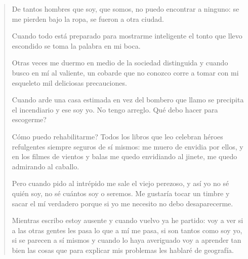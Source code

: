 \documentclass[12pt]{article}
\begin{document}
\clearpage
{}
\begin{verse}
De tantos hombres que soy, que somos,  
no puedo encontrar a ninguno:  
se me pierden bajo la ropa,  
se fueron a otra ciudad.  

Cuando todo está preparado  
para mostrarme inteligente  
el tonto que llevo escondido  
se toma la palabra en mi boca.  

Otras veces me duermo en medio  
de la sociedad distinguida  
y cuando busco en mí al valiente,  
un cobarde que no conozco  
corre a tomar con mi esqueleto  
mil deliciosas precauciones.  

Cuando arde una casa estimada  
en vez del bombero que llamo  
se precipita el incendiario  
y ese soy yo. No tengo arreglo.  
Qué debo hacer para escogerme?  

Cómo puedo rehabilitarme?  
Todos los libros que leo  
celebran héroes refulgentes  
siempre seguros de sí mismos:  
me muero de envidia por ellos,  
y en los filmes de vientos y balas  
me quedo envidiando al jinete,  
me quedo admirando al caballo.  

Pero cuando pido al intrépido  
me sale el viejo perezoso,  
y así yo no sé quién soy,  
no sé cuántos soy o seremos.  
Me gustaría tocar un timbre  
y sacar el mí verdadero  
porque si yo me necesito  
no debo desaparecerme.  

Mientras escribo estoy ausente  
y cuando vuelvo ya he partido:  
voy a ver si a las otras gentes  
les pasa lo que a mí me pasa,  
si son tantos como soy yo,  
si se parecen a sí mismos  
y cuando lo haya averiguado  
voy a aprender tan bien las cosas  
que para explicar mis problemas  
les hablaré de geografía.
\end{verse}
\end{document}

